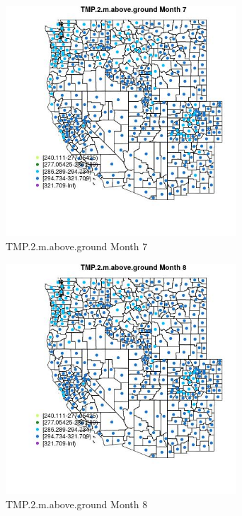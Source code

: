 \begin{figure} 
\centering  
\includegraphics[width=0.77\textwidth]{Code_Outputs/df_report_ML_predictors_CountyCentroid_Locations_Dates_2008-01-01to2018-12-31_MapObsMo7TMP2maboveground.jpg} 
\caption{\label{fig:df_report_ML_predictors_CountyCentroid_Locations_Dates_2008-01-01to2018-12-31MapObsMo7TMP2maboveground}TMP.2.m.above.ground Month 7} 
\end{figure} 
 

\begin{figure} 
\centering  
\includegraphics[width=0.77\textwidth]{Code_Outputs/df_report_ML_predictors_CountyCentroid_Locations_Dates_2008-01-01to2018-12-31_MapObsMo8TMP2maboveground.jpg} 
\caption{\label{fig:df_report_ML_predictors_CountyCentroid_Locations_Dates_2008-01-01to2018-12-31MapObsMo8TMP2maboveground}TMP.2.m.above.ground Month 8} 
\end{figure} 
 

